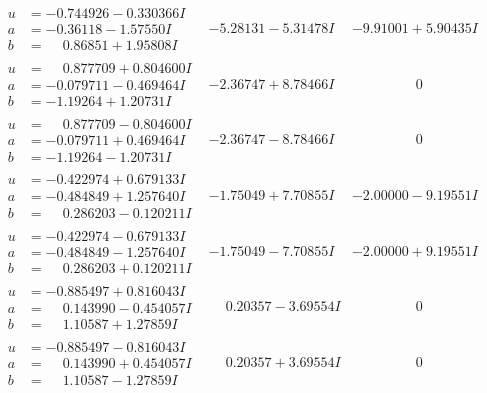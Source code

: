\documentclass[1p]{elsarticle_modified}
\theoremstyle{definition}
\begin{document}
$$\begin{array}{c|c|c}
\begin{aligned}
u &= -0.744926 - 0.330366 I \\
a &= -0.36118 - 1.57550 I \\
b &= \phantom{-}0.86851 + 1.95808 I\end{aligned}
 & -5.28131 - 5.31478 I & -9.91001 + 5.90435 I \\ \hline\begin{aligned}
u &= \phantom{-}0.877709 + 0.804600 I \\
a &= -0.079711 - 0.469464 I \\
b &= -1.19264 + 1.20731 I\end{aligned}
 & -2.36747 + 8.78466 I & \phantom{-0.000000 } 0 \\ \hline\begin{aligned}
u &= \phantom{-}0.877709 - 0.804600 I \\
a &= -0.079711 + 0.469464 I \\
b &= -1.19264 - 1.20731 I\end{aligned}
 & -2.36747 - 8.78466 I & \phantom{-0.000000 } 0 \\ \hline\begin{aligned}
u &= -0.422974 + 0.679133 I \\
a &= -0.484849 + 1.257640 I \\
b &= \phantom{-}0.286203 - 0.120211 I\end{aligned}
 & -1.75049 + 7.70855 I & -2.00000 - 9.19551 I \\ \hline\begin{aligned}
u &= -0.422974 - 0.679133 I \\
a &= -0.484849 - 1.257640 I \\
b &= \phantom{-}0.286203 + 0.120211 I\end{aligned}
 & -1.75049 - 7.70855 I & -2.00000 + 9.19551 I \\ \hline\begin{aligned}
u &= -0.885497 + 0.816043 I \\
a &= \phantom{-}0.143990 - 0.454057 I \\
b &= \phantom{-}1.10587 + 1.27859 I\end{aligned}
 & \phantom{-}0.20357 - 3.69554 I & \phantom{-0.000000 } 0 \\ \hline\begin{aligned}
u &= -0.885497 - 0.816043 I \\
a &= \phantom{-}0.143990 + 0.454057 I \\
b &= \phantom{-}1.10587 - 1.27859 I\end{aligned}
 & \phantom{-}0.20357 + 3.69554 I & \phantom{-0.000000 } 0 \\ \hline\begin{aligned}

\end{aligned}
\end{array}$$
\end{document}
